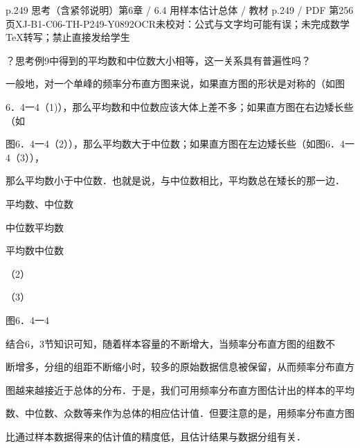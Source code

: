 \begin{bankitem}{p.249 思考（含紧邻说明）}{第6章 / 6.4 用样本估计总体 / 教材 p.249 / PDF 第256页}{XJ-B1-C06-TH-P249-Y0892}{OCR未校对：公式与文字均可能有误；未完成数学TeX转写；禁止直接发给学生}
\begin{ocrdraft}
\par
？思考例9中得到的平均数和中位数大小相等，这一关系具有普遍性吗？
\par
一般地，对一个单峰的频率分布直方图来说，如果直方图的形状是对称的（如图
\par
6．4一4（1)），那么平均数和中位数应该大体上差不多；如果直方图在右边矮长些（如
\par
图6．4一4（2）），那么平均数大于中位数；如果直方图在左边矮长些（如图6．4一4（3）），
\par
那么平均数小于中位数．也就是说，与中位数相比，平均数总在矮长的那一边．
\par
平均数、中位数
\par
中位数平均数
\par
平均数中位数
\par
（2）
\par
（3）
\par
图6．4一4
\par
结合6，3节知识可知，随着样本容量的不断增大，当频率分布直方图的组数不
\par
断增多，分组的组距不断缩小时，较多的原始数据信息被保留，从而频率分布直方
\par
图越来越接近于总体的分布．于是，我们可用频率分布直方图估计出的样本的平均
\par
数、中位数、众数等来作为总体的相应估计值．但要注意的是，用频率分布直方图
\par
比通过样本数据得来的估计值的精度低，且估计结果与数据分组有关．
\end{ocrdraft}
\end{bankitem}
